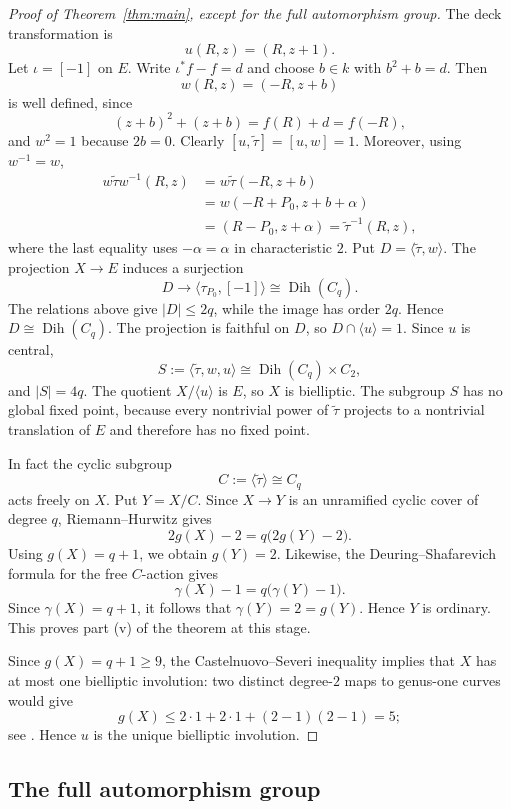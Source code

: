 \documentclass[11pt]{article}
\theoremstyle{remark}
\newcommand{\Dih}{\operatorname{Dih}}
\begin{document}
\begin{proof}[Proof of Theorem~\ref{thm:main}, except for the full automorphism group]
The deck transformation is
\[
 u(R,z)=(R,z+1).
\]
Let $\iota=[-1]$ on $E$.  Write $\iota^*f-f=d$ and choose $b\in k$ with
$b^2+b=d$.  Then
\[
 w(R,z)=(-R,z+b)
\]
is well defined, since
\[
 (z+b)^2+(z+b)=f(R)+d=f(-R),
\]
and $w^2=1$ because $2b=0$.  Clearly
$[u,\widetilde\tau]=[u,w]=1$.  Moreover, using $w^{-1}=w$,
\[
\begin{aligned}
 w\widetilde\tau w^{-1}(R,z)
 &=w\widetilde\tau(-R,z+b)\\
 &=w(-R+P_0,z+b+\alpha)\\
 &=(R-P_0,z+\alpha)
 =\widetilde\tau^{-1}(R,z),
\end{aligned}
\]
where the last equality uses $-\alpha=\alpha$ in characteristic $2$.
Put $D=\langle\widetilde\tau,w\rangle$.  The projection $X\to E$
induces a surjection
\[
        D\longrightarrow
        \langle\tau_{P_0},[-1]\rangle\cong\Dih(C_q).
\]
The relations above give $|D|\le2q$, while the image has order $2q$.
Hence $D\cong\Dih(C_q)$.  The projection is faithful on $D$, so
$D\cap\langle u\rangle=1$.  Since $u$ is central,
\[
        S:=\langle\widetilde\tau,w,u\rangle
        \cong\Dih(C_q)\times C_2,
\]
and $|S|=4q$.  The quotient $X/\langle u\rangle$ is $E$, so $X$ is
bielliptic.  The subgroup $S$ has no global fixed point, because every
nontrivial power of $\widetilde\tau$ projects to a nontrivial translation
of $E$ and therefore has no fixed point.

In fact the cyclic subgroup
\[
 C:=\langle\widetilde\tau\rangle\cong C_q
\]
acts freely on $X$.  Put $Y=X/C$.  Since $X\to Y$ is an unramified cyclic
cover of degree $q$, Riemann--Hurwitz gives
\[
 2g(X)-2=q\bigl(2g(Y)-2\bigr).
\]
Using $g(X)=q+1$, we obtain $g(Y)=2$.  Likewise, the
Deuring--Shafarevich formula for the free $C$-action gives
\[
 \gamma(X)-1=q\bigl(\gamma(Y)-1\bigr).
\]
Since $\gamma(X)=q+1$, it follows that $\gamma(Y)=2=g(Y)$.  Hence $Y$ is
ordinary.  This proves part \textup{(v)} of the theorem at this stage.

Since $g(X)=q+1\ge9$, the Castelnuovo--Severi inequality implies that $X$
has at most one bielliptic involution: two distinct degree-$2$ maps to
genus-one curves would give
\[
 g(X)\le 2\cdot1+2\cdot1+(2-1)(2-1)=5;
\]
see \cite[Theorem~III.10.3]{Stichtenoth}.  Hence $u$ is the unique
bielliptic involution.
\end{proof}

\subsection{The full automorphism group}
\end{document}
